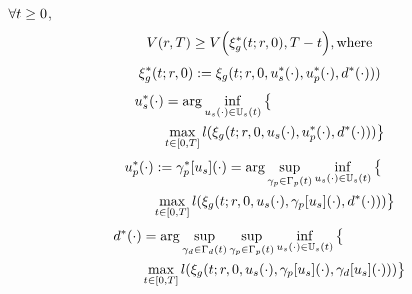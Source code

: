 \begin{prop}
  \label{prop:nonconv}
  $\forall t \ge 0$,
  \begin{equation}
  \label{eq:invariant_nonconv}
  \valfunc(\rstate,\thor) \ge \valfunc\Big(\rtraj^*(\tvar; \rstate, 0), \thor - \tvar \Big), \text{where}
  \end{equation}
  \begin{equation}
  \begin{aligned}
  \xi_g^*(t; r, 0) := \xi_g(t; r, 0, u_s^*(\cdot), u_p^*(\cdot), d^*(\cdot))) \\
  \end{aligned}
  \end{equation}
  \begin{equation}
  \begin{aligned}
  &u_s^*(\cdot) = \arg \inf_{u_s(\cdot)\in\mathbb{U}_s(t)}\big\{\\
  & \qquad \max_{t \in [0, T]} l(\xi_g(t; r, 0, u_s(\cdot), u_p^*(\cdot), d^*(\cdot))) \big\}\\
  \end{aligned}
  \end{equation}
  \begin{equation}
  \begin{aligned}
  & u_p^*(\cdot) := \gamma_p^*[u_s](\cdot) = \arg \sup_{\gamma_{p} \in \Gamma_p(t)} \inf_{u_s(\cdot) \in \mathbb{U}_s(t)} \big\{ \\
  & \qquad \max_{t \in [0, T]} l(\xi_g(t; r, 0, u_s(\cdot), \gamma_p[u_s](\cdot), d^*(\cdot))) \big\} \\
  \end{aligned}
  \end{equation}
  \begin{equation}
  \begin{aligned}
  & d^*(\cdot) = \arg \sup_{\gamma_{d} \in \Gamma_d(t)} \sup_{\gamma_{p} \in \Gamma_p(t)} \inf_{u_s(\cdot) \in \mathbb{U}_s(t)} \big\{\\
  & \qquad \max_{t \in [0, T]} l(\xi_g(t; r, 0, u_s(\cdot), \gamma_p[u_s](\cdot), \gamma_d[u_s](\cdot))) \big\}
  \end{aligned}
  \end{equation}
\end{prop}

